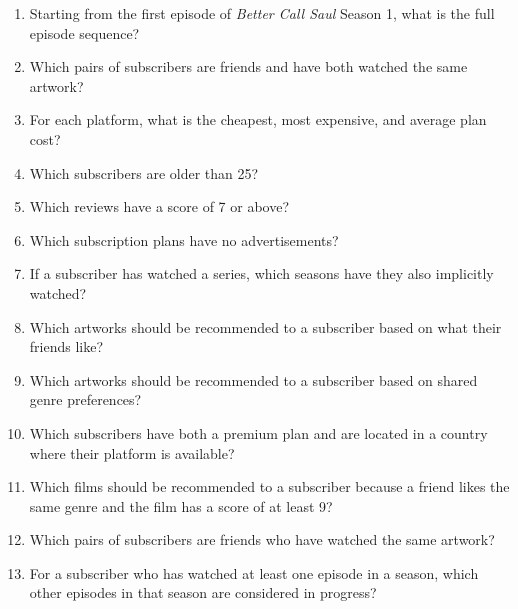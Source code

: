 \begin{enumerate}
    \item Starting from the first episode of \textit{Better Call Saul} Season 1, what is the full episode sequence?
    \item Which pairs of subscribers are friends and have both watched the same artwork?
    \item For each platform, what is the cheapest, most expensive, and average plan cost?
    \item Which subscribers are older than 25?
    \item Which reviews have a score of 7 or above?
    \item Which subscription plans have no advertisements?
    \item If a subscriber has watched a series, which seasons have they also implicitly watched?
    \item Which artworks should be recommended to a subscriber based on what their friends like?
    \item Which artworks should be recommended to a subscriber based on shared genre preferences?
    \item Which subscribers have both a premium plan and are located in a country where their platform is available?
    \item Which films should be recommended to a subscriber because a friend likes the same genre and the film has a score of at least 9?
    \item Which pairs of subscribers are friends who have watched the same artwork?
    \item For a subscriber who has watched at least one episode in a season, which other episodes in that season are considered in progress? 
\end{enumerate}
